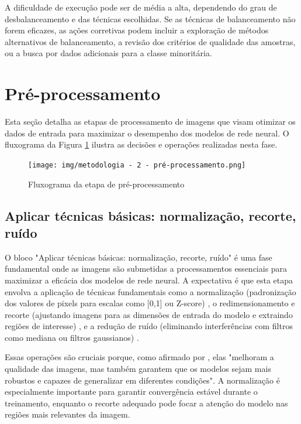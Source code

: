 A dificuldade de execução pode ser de média a alta, dependendo do grau de desbalanceamento e das técnicas escolhidas. Se as técnicas de balanceamento não forem eficazes, as ações corretivas podem incluir a exploração de métodos alternativos de balanceamento, a revisão dos critérios de qualidade das amostras, ou a busca por dados adicionais para a classe minoritária.

\section{Pré-processamento}

Esta seção detalha as etapas de processamento de imagens que visam otimizar os dados de entrada para maximizar o desempenho dos modelos de rede neural. O fluxograma da Figura \ref{fig:fluxograma_preprocessamento} ilustra as decisões e operações realizadas nesta fase.

\begin{figure}[H]
    \centering
    \caption{\label{fig:fluxograma_preprocessamento}Fluxograma da etapa de pré-processamento}
    \texttt{[image: img/metodologia - 2 - pré-processamento.png]}
\end{figure}

\subsection{Aplicar técnicas básicas: normalização, recorte, ruído}
O bloco "Aplicar técnicas básicas: normalização, recorte, ruído" é uma fase fundamental onde as imagens são submetidas a processamentos essenciais para maximizar a eficácia dos modelos de rede neural. A expectativa é que esta etapa envolva a aplicação de técnicas fundamentais como a normalização (padronização dos valores de pixels para escalas como [0,1] ou Z-score) \cite{Sharma2024}, o redimensionamento e recorte (ajustando imagens para as dimensões de entrada do modelo e extraindo regiões de interesse) \cite{Sharma2024}, e a redução de ruído (eliminando interferências com filtros como mediana ou filtros gaussianos) \cite{Sharma2024}.

Essas operações são cruciais porque, como afirmado por , elas "melhoram a qualidade das imagens, mas também garantem que os modelos sejam mais robustos e capazes de generalizar em diferentes condições". A normalização é especialmente importante para garantir convergência estável durante o treinamento, enquanto o recorte adequado pode focar a atenção do modelo nas regiões mais relevantes da imagem.

